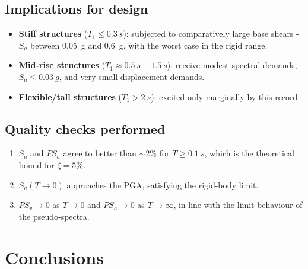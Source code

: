 \documentclass[11pt,a4paper]{article}
\begin{document}
\subsection{Implications for design}
\begin{itemize}[leftmargin=1.4em,itemsep=0.15em]
  \item \textbf{Stiff structures} ($T_1 \le \SI{0.3}{s}$): subjected
        to comparatively large base shears - $S_a$ between
        \SI{0.05}{g} and \SI{0.6}{g}, with the worst case in the
        rigid range.
  \item \textbf{Mid-rise structures} ($T_1 \approx \SI{0.5}{s}-\SI{1.5}{s}$):
        receive modest spectral demands, $S_a \le \SI{0.03}{g}$, and
        very small displacement demands.
  \item \textbf{Flexible/tall structures} ($T_1 > \SI{2}{s}$): excited
        only marginally by this record.
\end{itemize}

\subsection{Quality checks performed}
\begin{enumerate}[leftmargin=1.4em,itemsep=0.15em]
  \item $S_a$ and $PS_a$ agree to better than $\sim 2\%$ for
        $T \ge \SI{0.1}{s}$, which is the theoretical bound for
        $\zeta = 5\%$.
  \item $S_a(T \to 0)$ approaches the PGA, satisfying the rigid-body
        limit.
  \item $PS_v \to 0$ as $T \to 0$ and $PS_a \to 0$ as $T \to \infty$,
        in line with the limit behaviour of the pseudo-spectra.
\end{enumerate}

\section{Conclusions}
\end{document}
